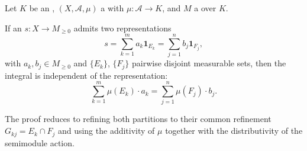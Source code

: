 \begin{proposition} \label{proposition:well_definedness_of_integral_of_sigma_complete_lattice_ordered_semimodule_valued_simple_function_on_a_measure_space_on_a_measurable_space_with_values_in_an_ordered_semiring}
Let $K$ be an , $(X,\mathcal{A},\mu)$ a  with $\mu : \mathcal{A} \to K$, and $M$ a  over $K$.

If an  $s : X \to M_{\geq 0}$ admits two representations
$$s = \sum_{k=1}^m a_k \mathbf{1}_{E_k} = \sum_{j=1}^n b_j \mathbf{1}_{F_j},$$
with $a_k, b_j \in M_{\geq 0}$ and $\{E_k\}$, $\{F_j\}$ pairwise disjoint measurable sets, then the integral is independent of the representation:
$$\sum_{k=1}^m \mu(E_k) \cdot a_k = \sum_{j=1}^n \mu(F_j) \cdot b_j.$$

The proof reduces to refining both partitions to their common refinement $G_{kj} = E_k \cap F_j$ and using the additivity of $\mu$ together with the distributivity of the semimodule action.
\end{proposition}
